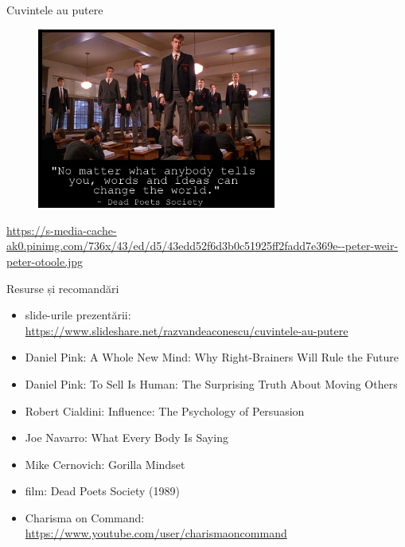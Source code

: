 \documentclass{beamer}
\begin{document}
\begin{frame}{Cuvintele au putere}
  \begin{figure}
    \centering
    \includegraphics[width=0.7\textwidth]{img/dead-poets-society-words-change}
  \end{figure}
  \begin{center}
    \tiny
    \url{https://s-media-cache-ak0.pinimg.com/736x/43/ed/d5/43edd52f6d3b0c51925ff2fadd7e369e--peter-weir-peter-otoole.jpg}
  \end{center}
\end{frame}

\begin{frame}{Resurse și recomandări}
  \begin{itemize}
    \item slide-urile prezentării: \url{https://www.slideshare.net/razvandeaconescu/cuvintele-au-putere}
    \item Daniel Pink: A Whole New Mind: Why Right-Brainers Will Rule the Future
    \item Daniel Pink: To Sell Is Human: The Surprising Truth About Moving Others
    \item Robert Cialdini: Influence: The Psychology of Persuasion
    \item Joe Navarro: What Every Body Is Saying
    \item Mike Cernovich: Gorilla Mindset
    \item film: Dead Poets Society (1989)
    \item Charisma on Command: \url{https://www.youtube.com/user/charismaoncommand}
  \end{itemize}
\end{frame}
\end{document}
